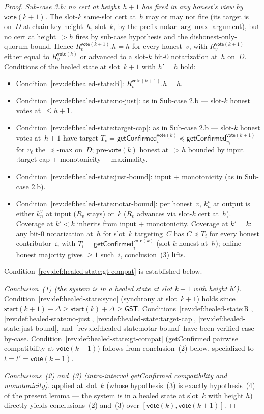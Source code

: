 \ifx\litemode\undefined\documentclass{article}\fi
\newcommand{\start}{\mathsf{start}}
\newcommand{\vote}{\mathsf{vote}}
\newcommand{\comm}[1]{\bar{#1}}
\newcommand{\getConfirmed}{\textsf{getConfirmed}\xspace}
\theoremstyle{plain}
\theoremstyle{definition}
\theoremstyle{remark}
\newcommand{\GST}{\ensuremath{\mathsf{GST}}}
\newcommand{\OHM}{online-honest majority\xspace}
\begin{document}
\begin{proof}
\emph{Sub-case 3.b: no cert at height~$h+1$ has fired in any honest's view by $\vote(k+1)$.}
The slot-$k$ same-slot cert at~$h$ may or may not fire (its target is on~$D$ at chain-key height~$h$, slot~$k$, by the prefix-notar $\arg\max$ argument), but no cert at height~$>h$ fires by sub-case hypothesis and the dishonest-only-quorum bound. Hence $R_v^{\vote(k+1)}.h = h$ for every honest~$v$, with $R_v^{\vote(k+1)}$ either equal to $R_v^{\vote(k)}$ or advanced to a slot-$k$ bit-$0$ notarization at~$h$ on~$D$. Conditions of the healed state at slot~$k+1$ with $\comm{h}' = h$ hold:
\begin{itemize}
  \item Condition~\ref{rev:def:healed-state:R}: $R_v^{\vote(k+1)}.h = h$.
  \item Condition~\ref{rev:def:healed-state:no-just}: as in Sub-case 2.b — slot-$k$ honest votes at~$\leq h+1$.
  \item Condition~\ref{rev:def:healed-state:target-cap}: as in Sub-case 2.b — slot-$k$ honest votes at~$h+1$ have target $T_v = \getConfirmed_v^{\vote(k)} \preceq \getConfirmed_{v_\ell}^{\vote(k+1)}$ for $v_\ell$ the $\preceq$-max on~$D$; pre-$\vote(k)$ honest at~$>h$ bounded by input :target-cap + monotonicity + maximality.
  \item Condition~\ref{rev:def:healed-state:just-bound}: input + monotonicity (as in Sub-case 2.b).
  \item Condition~\ref{rev:def:healed-state:notar-bound}: per honest~$v$, $k_n^v$ at output is either $k_n^v$ at input ($R_v$ stays) or~$k$ ($R_v$ advances via slot-$k$ cert at~$h$). Coverage at $k' < k$ inherits from input + monotonicity. Coverage at $k' = k$: any bit-$0$ notarization at~$h$ for slot~$k$ targeting~$C$ has $C \preceq T_i$ for every honest contributor~$i$, with $T_i = \getConfirmed_i^{\vote(k)}$ (slot-$k$ honest at~$h$); \OHM gives $\geq 1$ such~$i$, conclusion~(3) lifts.
\end{itemize}
Condition~\ref{rev:def:healed-state:gt-compat} is established below.

\emph{Conclusion~(1) (the system is in a healed state at slot $k+1$ with height $\comm{h}'$).}
Condition~\ref{rev:def:healed-state:sync} (synchrony at slot~$k+1$) holds since $\start(k+1) - \Delta \geq \start(k) + \Delta \geq \GST$. Conditions~\ref{rev:def:healed-state:R}, \ref{rev:def:healed-state:no-just}, \ref{rev:def:healed-state:target-cap}, \ref{rev:def:healed-state:just-bound}, and~\ref{rev:def:healed-state:notar-bound} have been verified case-by-case. Condition~\ref{rev:def:healed-state:gt-compat} (\getConfirmed{} pairwise compatibility at $\vote(k+1)$) follows from conclusion~(2) below, specialized to $t = t' = \vote(k+1)$.

\emph{Conclusions~(2) and~(3) (intra-interval \getConfirmed{} compatibility and monotonicity).}
 applied at slot~$k$ (whose hypothesis~(3) is exactly hypothesis~(4) of the present lemma — the system is in a healed state at slot~$k$ with height $\comm{h}$) directly yields conclusions~(2) and~(3) over $[\vote(k),\vote(k+1)]$.
\end{proof}
\end{document}
